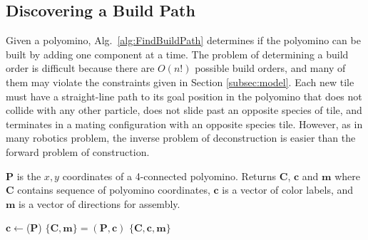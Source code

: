 




\subsection{Discovering a Build Path}

Given a polyomino, Alg.~\ref{alg:FindBuildPath} determines if the polyomino can be built by adding one component at a time.
 The  problem of determining a build order is difficult because there are $O(n!)$ possible build orders, and many of them may  violate the constraints given in Section \ref{subsec:model}.  
 Each new tile must have a straight-line path to its goal position in the polyomino that does not collide with any other particle, does not slide past an opposite species of tile, and terminates in a mating configuration with an opposite species tile.
However, as in many robotics problem, the inverse problem of deconstruction is easier than the forward problem of construction.  

\begin{algorithm}
\newcommand\algotext[1]{\end{algorithmic}#1\begin{algorithmic}[1]}
\caption{($\mathbf{P})$   \label{alg:FindBuildPath}}
$\mathbf{P}$ is the $x,y$ coordinates of a 4-connected polyomino. %
Returns $ \mathbf{C} $, $ \mathbf{c} $ and $\mathbf{m}$ where $ \mathbf{C} $ contains sequence of polyomino coordinates, $ \mathbf{c} $ is a vector of color labels, and $\mathbf{m}$ is a vector of directions for assembly.
\begin{algorithmic}[1]

\State\hbox{$ \mathbf{c}\leftarrow${}($\mathbf{P}$)}
\State $\{\mathbf{C},\mathbf{m} \}= ${}$(\mathbf{P},\mathbf{c})$
\State \Return $\{ \mathbf{C},\mathbf{c}, \mathbf{m} \} $ 
\end{algorithmic}
\end{algorithm} 

